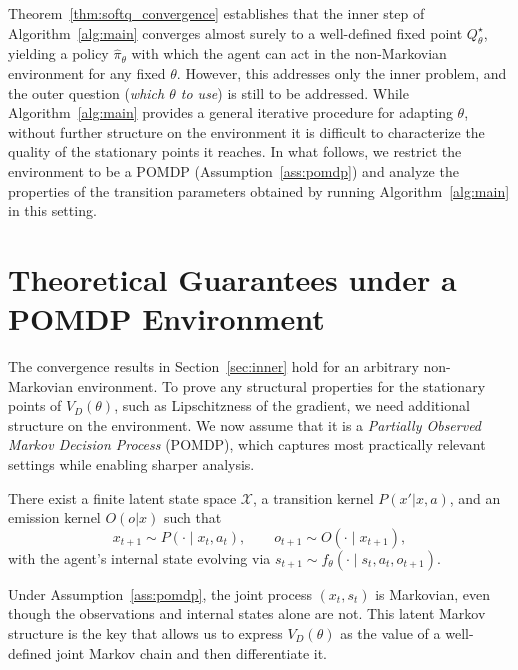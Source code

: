 \documentclass[12pt]{article}
\renewcommand{\[}{\left[}
\renewcommand{\]}{\right]}
\renewcommand{\(}{\left(}
\renewcommand{\)}{\right)}
\newcounter{l1}
\newcounter{l2}
\newcounter{l3}
\begin{document}
Theorem~\ref{thm:softq_convergence} establishes that the inner step of
Algorithm~\ref{alg:main} converges almost surely to a well-defined fixed point
$Q^\star_\theta$, yielding a policy $\widehat{\pi}_\theta$ with which the agent
can act in the non-Markovian environment for any fixed $\theta$. However, this
addresses only the inner problem, and the outer question (\emph{which $\theta$ to
use}) is still to be addressed. While Algorithm~\ref{alg:main} provides a general iterative
procedure for adapting $\theta$, without further structure on the environment
it is difficult to characterize the quality of the stationary points it reaches.
In what follows, we restrict the environment to be a POMDP
(Assumption~\ref{ass:pomdp}) and analyze the properties of the transition
parameters obtained by running Algorithm~\ref{alg:main} in this setting. 
\section{Theoretical Guarantees under a POMDP Environment}
\label{sec:theory}

The convergence results in Section~\ref{sec:inner} hold for an arbitrary non-Markovian
environment. To prove any structural properties for the stationary points of $V_D(\theta)$, such as Lipschitzness of the gradient, we need additional
structure on the environment. We now assume that it is a \emph{Partially Observed Markov
Decision Process} (POMDP), which captures most practically relevant settings while
enabling sharper analysis.

\begin{assumption}\label{ass:pomdp}
There exist a finite latent state space $\mathcal{X}$, a transition kernel $P(x'|x,a)$,
and an emission kernel $O(o|x)$ such that
\begin{equation*}
  x_{t+1} \sim P(\cdot \mid x_t, a_t),
  \qquad
  o_{t+1} \sim O(\cdot \mid x_{t+1}),
\end{equation*}
with the agent's internal state evolving via
$s_{t+1} \sim f_\theta(\cdot \mid s_t, a_t, o_{t+1})$.
\end{assumption}

Under Assumption~\ref{ass:pomdp}, the joint process $(x_t, s_t)$ is Markovian, even
though the observations and internal states alone are not. This latent Markov structure
is the key that allows us to express $V_D(\theta)$ as the value of a well-defined joint
Markov chain and then differentiate it.
\end{document}
